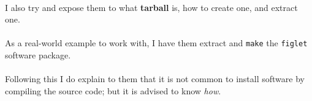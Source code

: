 \documentclass[11pt]{article}
\begin{document}
	\begin{center}
		\graphicspath{ {.} }
		\centering
	\end{center}	

	\hrulefill

	\newpage

	\paragraph{} I also try and expose them to what \textbf{tarball} is, how to create one, and extract one. 


	\begin{center}
		\graphicspath{ {.} }
		\centering
	\end{center}	


	\paragraph{} As a real-world example to work with, I have them extract and \texttt{make} the \texttt{figlet} software package. 

	\begin{center}
		\graphicspath{ {.} }
		\centering
	\end{center}	

	\paragraph{} Following this I do explain to them that it is not common to install software by compiling the source code; but it is advised to know \textit{how}.
\end{document}
